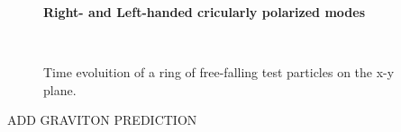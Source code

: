 \begin{figure}
\centering
    \textbf{ Right- and Left-handed cricularly polarized modes}\par\medskip
\centering

 \quad
{} \\
\caption{Time evoluition of a ring of free-falling test particles on the x-y plane.}
\label{plus_and_times}

\end{figure}

ADD GRAVITON PREDICTION




